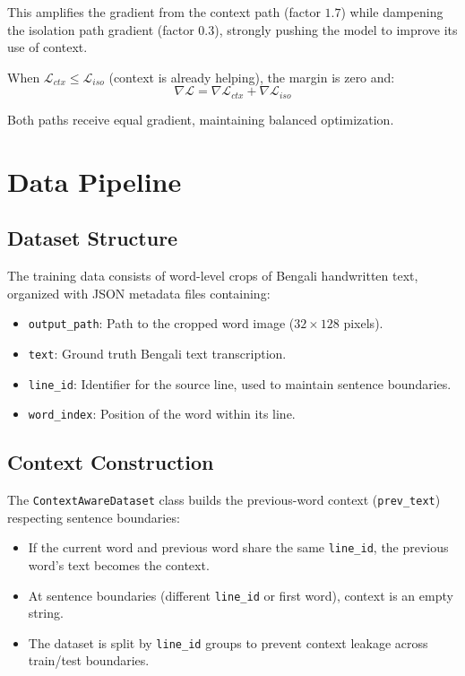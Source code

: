 \documentclass[11pt, a4paper]{article}
\begin{document}
This amplifies the gradient from the context path (factor $1.7$) while dampening the isolation path gradient (factor $0.3$), strongly pushing the model to improve its use of context.

When $\mathcal{L}_{ctx} \leq \mathcal{L}_{iso}$ (context is already helping), the margin is zero and:
\[
\nabla \mathcal{L} = \nabla \mathcal{L}_{ctx} + \nabla \mathcal{L}_{iso}
\]

Both paths receive equal gradient, maintaining balanced optimization.

\section{Data Pipeline}

\subsection{Dataset Structure}

The training data consists of word-level crops of Bengali handwritten text, organized with JSON metadata files containing:

\begin{itemize}
    \item \texttt{output\_path}: Path to the cropped word image ($32 \times 128$ pixels).
    \item \texttt{text}: Ground truth Bengali text transcription.
    \item \texttt{line\_id}: Identifier for the source line, used to maintain sentence boundaries.
    \item \texttt{word\_index}: Position of the word within its line.
\end{itemize}

\subsection{Context Construction}

The \texttt{ContextAwareDataset} class builds the previous-word context (\texttt{prev\_text}) respecting sentence boundaries:

\begin{itemize}
    \item If the current word and previous word share the same \texttt{line\_id}, the previous word's text becomes the context.
    \item At sentence boundaries (different \texttt{line\_id} or first word), context is an empty string.
    \item The dataset is split by \texttt{line\_id} groups to prevent context leakage across train/test boundaries.
\end{itemize}
\end{document}
